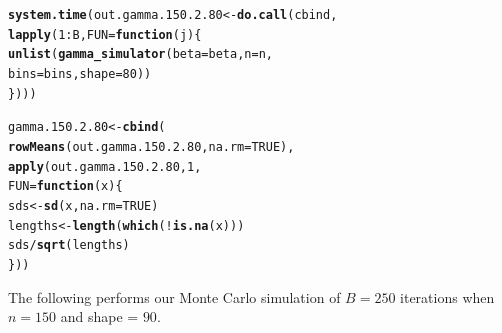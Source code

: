 \documentclass[11pt]{article}\usepackage[]{graphicx}\usepackage[]{color}
\makeatletter
\newcommand{\hlnum}[1]{\textcolor[rgb]{0.686,0.059,0.569}{#1}}%
\newcommand{\hlopt}[1]{\textcolor[rgb]{0,0,0}{#1}}%
\newcommand{\hlstd}[1]{\textcolor[rgb]{0.345,0.345,0.345}{#1}}%
\newcommand{\hlkwa}[1]{\textcolor[rgb]{0.161,0.373,0.58}{\textbf{#1}}}%
\newcommand{\hlkwb}[1]{\textcolor[rgb]{0.69,0.353,0.396}{#1}}%
\newcommand{\hlkwc}[1]{\textcolor[rgb]{0.333,0.667,0.333}{#1}}%
\newcommand{\hlkwd}[1]{\textcolor[rgb]{0.737,0.353,0.396}{\textbf{#1}}}%
\newenvironment{kframe}{%
 \def\at@end@of@kframe{}%
 \ifinner\ifhmode%
  \def\at@end@of@kframe{\end{minipage}}%
  \begin{minipage}{\columnwidth}%
 \fi\fi%
 \def\FrameCommand##1{\hskip\@totalleftmargin \hskip-\fboxsep
 \colorbox{shadecolor}{##1}\hskip-\fboxsep
     \hskip-\linewidth \hskip-\@totalleftmargin \hskip\columnwidth}%
 \MakeFramed {\advance\hsize-\width
   \@totalleftmargin\z@ \linewidth\hsize
   \@setminipage}}%
 {\par\unskip\endMakeFramed%
 \at@end@of@kframe}
\newenvironment{knitrout}{}{} %
\makeatother
\begin{document}
\begin{knitrout}
\color{fgcolor}\begin{kframe}
\begin{alltt}
\hlkwd{system.time}\hlstd{(out.gamma.150.2.80} \hlkwb{<-} \hlkwd{do.call}\hlstd{(cbind,}
  \hlkwd{lapply}\hlstd{(}\hlnum{1}\hlopt{:}\hlstd{B,} \hlkwc{FUN} \hlstd{=} \hlkwa{function}\hlstd{(}\hlkwc{j}\hlstd{)\{}
    \hlkwd{unlist}\hlstd{(}\hlkwd{gamma_simulator}\hlstd{(}\hlkwc{beta} \hlstd{= beta,} \hlkwc{n} \hlstd{= n,}
      \hlkwc{bins} \hlstd{= bins,} \hlkwc{shape} \hlstd{=} \hlnum{80}\hlstd{))}
\hlstd{\})))}
\end{alltt}


{\ttfamily\noindent\bfseries\color{errorcolor}{\#\# Error in eval(family\$initialize): non-positive values not allowed for the 'gamma' family}}

{\ttfamily\noindent\itshape\color{messagecolor}{\#\# Timing stopped at: 0.003 0 0.002}}\end{kframe}
\end{knitrout}

\begin{knitrout}
\color{fgcolor}\begin{kframe}
\begin{alltt}
\hlstd{gamma.150.2.80} \hlkwb{<-} \hlkwd{cbind}\hlstd{(}
  \hlkwd{rowMeans}\hlstd{(out.gamma.150.2.80,} \hlkwc{na.rm} \hlstd{=} \hlnum{TRUE}\hlstd{),}
  \hlkwd{apply}\hlstd{(out.gamma.150.2.80,} \hlnum{1}\hlstd{,}
  \hlkwc{FUN} \hlstd{=} \hlkwa{function}\hlstd{(}\hlkwc{x}\hlstd{)\{}
    \hlstd{sds} \hlkwb{<-} \hlkwd{sd}\hlstd{(x,} \hlkwc{na.rm} \hlstd{=} \hlnum{TRUE}\hlstd{)}
    \hlstd{lengths} \hlkwb{<-} \hlkwd{length}\hlstd{(}\hlkwd{which}\hlstd{(}\hlopt{!}\hlkwd{is.na}\hlstd{(x)))}
    \hlstd{sds} \hlopt{/} \hlkwd{sqrt}\hlstd{(lengths)}
  \hlstd{\}))}
\end{alltt}


{\ttfamily\noindent\bfseries\color{errorcolor}{\#\# Error in is.data.frame(x): object 'out.gamma.150.2.80' not found}}\end{kframe}
\end{knitrout}

The following performs our Monte Carlo simulation of $B = 250$ iterations 
when $n = 150$ and shape = $90$.
\end{document}
